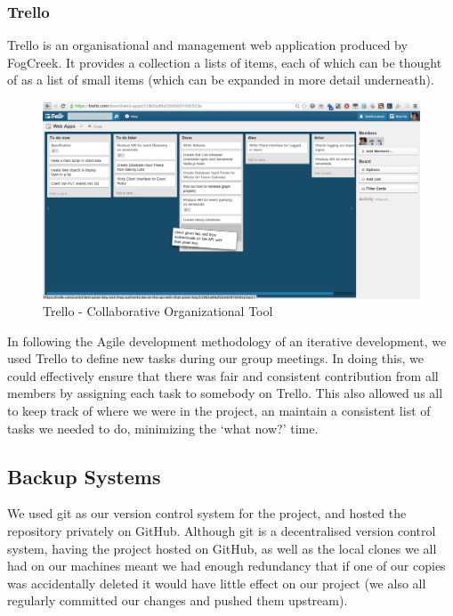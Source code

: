 \documentclass[11pt]{article}
\let\footnote=\endnote
\begin{document}
\subsubsection {Trello}

Trello\footnote{\url{http://trello.com}} is an organisational and management web application produced by FogCreek. It provides a collection a lists of items, each of which can be thought of as a list of small items (which can be expanded in more detail underneath).

\begin{figure}[H]
\centering
\includegraphics[scale=0.35]{images/trello.png}
\caption{\label{fig:trello} Trello - Collaborative Organizational Tool}
\end{figure}
In following the Agile development methodology of an iterative development, we used Trello to define new tasks during our group meetings. In doing this, we could effectively ensure that there was fair and consistent contribution from all members by assigning each task to somebody on Trello. This also allowed us all to keep track of where we were in the project, an maintain a consistent list of tasks we needed to do, minimizing the `what now?' time.

\subsection {Backup Systems}
We used git as our version control system for the project, and hosted the repository privately on GitHub. Although git is a decentralised version control system, having the project hosted on GitHub, as well as the local clones we all had on our machines meant we had enough redundancy that if one of our copies was accidentally deleted it would have little effect on our project (we also all regularly committed our changes and pushed them upstream).
\end{document}
